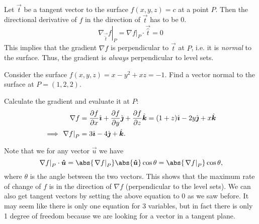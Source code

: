 \documentclass[../multivariate_calculus.tex]{subfiles}
\begin{document}
        \paragraph{}
        Let $\vec{t}$ be a tangent vector to the surface $f(x,y,z)=c$ at a point $P$.
        Then the directional derivative of $f$ in the direction of $\vec{t}$ has to be 0.
        \begin{equation}
            \left.\nabla_{\vec{\hat{t}}}f\right|_P=\left.\nabla f\right|_P\cdot\vec{\hat{t}}=0
        \end{equation}
        This implies that the gradient $\nabla f$ is perpendicular to $\vec{t}$ at $P$, i.e. it is \textit{normal} to the surface.
        Thus, the gradient is \textit{always} perpendicular to level sets.
        \begin{example}
            Consider the surface $f(x,y,z)=x-y^2+xz=-1$.
            Find a vector normal to the surface at $P=(1,2,2)$.

            Calculate the gradient and evaluate it at $P$:
            \begin{align}
                \nabla f&=\pdv{f}{x}\ihat+\pdv{f}{y}\jhat+\pdv{f}{z}\khat=(1+z)\ihat-2y\jhat+x\khat\\
                \implies\left.\nabla f\right|_P&=3\ihat-4\jhat+\khat.
            \end{align}
        \end{example}
        Note that we for any vector $\vec{u}$ we have
        \begin{equation}
            \left.\nabla f\right|_P\cdot\vec{\hat{u}}=\abs{\left.\nabla f\right|_P}\abs{\vec{\hat{u}}}\cos\theta=\abs{\left.\nabla f\right|_P}\cos\theta,
        \end{equation}
        where $\theta$ is the angle between the two vectors.
        This shows that the maximum rate of change of $f$ is in the direction of $\nabla f$ (perpendicular to the level sets).
        We can also get tangent vectors by setting the above equation to 0 as we saw before.
        It may seem like there is only one equation for 3 variables, but in fact there is only 1 degree of freedom because we are looking for a vector in a tangent plane.
\end{document}
